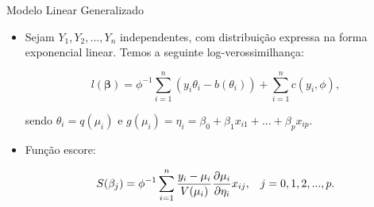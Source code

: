 \documentclass[10pt, aspectratio=169]{beamer}
\begin{document}


\begin{frame}{Modelo Linear Generalizado} 

\begin{itemize}


\item Sejam $Y_{1},Y_{2},...,Y_{n}$ independentes, com distribuição expressa na forma exponencial linear. Temos a seguinte log-verossimilhança:

$$
    l(\boldsymbol{\beta })=\phi^{-1}\sum_{i=1}^{n}(y_{i}\theta_{i}-b(\theta_{i}))+\sum_{i=1}^{n}c(y_{i},\phi),
$$

sendo $\theta_i=q(\mu_i) \text{ e } g(\mu_i)=\eta_i=\beta_{0}+\beta_{1}x_{i1}+...+\beta_{p}x_{ip}.$


\item Função escore:

$$
   S(\beta_j)=\phi^{-1}\sum_{i=1}^{n}\frac{y_{i}-\mu_{i}}{V(\mu_{i})} \frac{\partial \mu_{i}}{\partial \eta_{i}}x_{ij}, \hspace{0,3cm} j=0,1,2,...,p.
$$




\end{itemize}

\end{frame}



\end{document}
